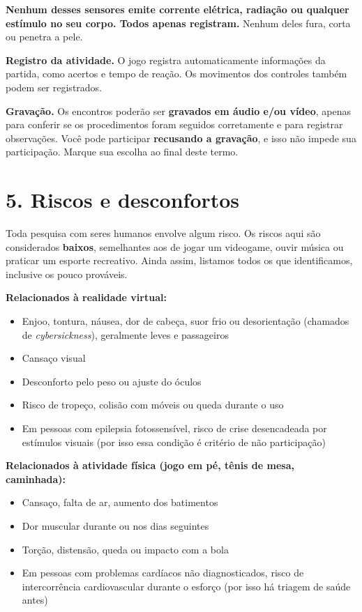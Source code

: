 \documentclass[12pt,a4paper]{article}
\begin{document}
\textbf{Nenhum desses sensores emite corrente elétrica, radiação ou qualquer
estímulo no seu corpo. Todos apenas registram.} Nenhum deles fura, corta ou
penetra a pele.

\textbf{Registro da atividade.} O jogo registra automaticamente informações da
partida, como acertos e tempo de reação. Os movimentos dos controles também
podem ser registrados.

\textbf{Gravação.} Os encontros poderão ser \textbf{gravados em áudio e/ou
vídeo}, apenas para conferir se os procedimentos foram seguidos corretamente e
para registrar observações. Você pode participar \textbf{recusando a gravação}, e
isso não impede sua participação. Marque sua escolha ao final deste termo.

\section*{5. Riscos e desconfortos}

Toda pesquisa com seres humanos envolve algum risco. Os riscos aqui são
considerados \textbf{baixos}, semelhantes aos de jogar um videogame, ouvir
música ou praticar um esporte recreativo. Ainda assim, listamos todos os que
identificamos, inclusive os pouco prováveis.

\textbf{Relacionados à realidade virtual:}
\begin{itemize}
  \item Enjoo, tontura, náusea, dor de cabeça, suor frio ou desorientação (chamados de \textit{cybersickness}), geralmente leves e passageiros
  \item Cansaço visual
  \item Desconforto pelo peso ou ajuste do óculos
  \item Risco de tropeço, colisão com móveis ou queda durante o uso
  \item Em pessoas com epilepsia fotossensível, risco de crise desencadeada por estímulos visuais (por isso essa condição é critério de não participação)
\end{itemize}

\textbf{Relacionados à atividade física (jogo em pé, tênis de mesa, caminhada):}
\begin{itemize}
  \item Cansaço, falta de ar, aumento dos batimentos
  \item Dor muscular durante ou nos dias seguintes
  \item Torção, distensão, queda ou impacto com a bola
  \item Em pessoas com problemas cardíacos não diagnosticados, risco de intercorrência cardiovascular durante o esforço (por isso há triagem de saúde antes)
\end{itemize}
\end{document}
